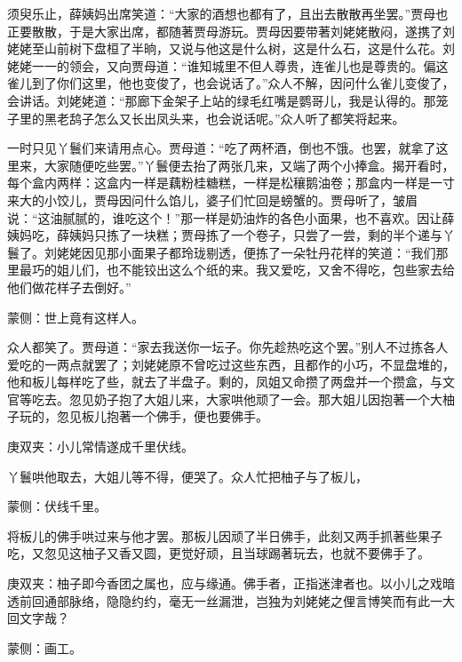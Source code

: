 \begin{parag}
    须臾乐止，薛姨妈出席笑道：“大家的酒想也都有了，且出去散散再坐罢。”贾母也正要散散，于是大家出席，都随著贾母游玩。贾母因要带著刘姥姥散闷，遂携了刘姥姥至山前树下盘桓了半晌，又说与他这是什么树，这是什么石，这是什么花。刘姥姥一一的领会，又向贾母道：“谁知城里不但人尊贵，连雀儿也是尊贵的。偏这雀儿到了你们这里，他也变俊了，也会说话了。”众人不解，因问什么雀儿变俊了，会讲话。刘姥姥道：“那廊下金架子上站的绿毛红嘴是鹦哥儿，我是认得的。那笼子里的黑老鸹子怎么又长出凤头来，也会说话呢。”众人听了都笑将起来。
\end{parag}


\begin{parag}
    一时只见丫鬟们来请用点心。贾母道：“吃了两杯酒，倒也不饿。也罢，就拿了这里来，大家随便吃些罢。”丫鬟便去抬了两张几来，又端了两个小捧盒。揭开看时，每个盒内两样：这盒内一样是藕粉桂糖糕，一样是松穰鹅油卷；那盒内一样是一寸来大的小饺儿，贾母因问什么馅儿，婆子们忙回是螃蟹的。贾母听了，皱眉说：“这油腻腻的，谁吃这个！”那一样是奶油炸的各色小面果，也不喜欢。因让薛姨妈吃，薛姨妈只拣了一块糕；贾母拣了一个卷子，只尝了一尝，剩的半个递与丫鬟了。刘姥姥因见那小面果子都玲珑剔透，便拣了一朵牡丹花样的笑道：“我们那里最巧的姐儿们，也不能铰出这么个纸的来。我又爱吃，又舍不得吃，包些家去给他们做花样子去倒好。”\begin{note}蒙侧：世上竟有这样人。\end{note}众人都笑了。贾母道：“家去我送你一坛子。你先趁热吃这个罢。”别人不过拣各人爱吃的一两点就罢了；刘姥姥原不曾吃过这些东西，且都作的小巧，不显盘堆的，他和板儿每样吃了些，就去了半盘子。剩的，凤姐又命攒了两盘并一个攒盒，与文官等吃去。忽见奶子抱了大姐儿来，大家哄他顽了一会。那大姐儿因抱著一个大柚子玩的，忽见板儿抱著一个佛手，便也要佛手。\begin{note}庚双夹：小儿常情遂成千里伏线。\end{note}丫鬟哄他取去，大姐儿等不得，便哭了。众人忙把柚子与了板儿，\begin{note}蒙侧：伏线千里。\end{note}将板儿的佛手哄过来与他才罢。那板儿因顽了半日佛手，此刻又两手抓著些果子吃，又忽见这柚子又香又圆，更觉好顽，且当球踢著玩去，也就不要佛手了。\begin{note}庚双夹：柚子即今香团之属也，应与缘通。佛手者，正指迷津者也。以小儿之戏暗透前回通部脉络，隐隐约约，毫无一丝漏泄，岂独为刘姥姥之俚言博笑而有此一大回文字哉？\end{note}\begin{note}蒙侧：画工。\end{note}
\end{parag}


